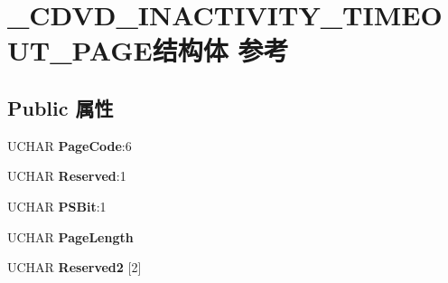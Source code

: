 \hypertarget{struct___c_d_v_d___i_n_a_c_t_i_v_i_t_y___t_i_m_e_o_u_t___p_a_g_e}{}\section{\+\_\+\+C\+D\+V\+D\+\_\+\+I\+N\+A\+C\+T\+I\+V\+I\+T\+Y\+\_\+\+T\+I\+M\+E\+O\+U\+T\+\_\+\+P\+A\+G\+E结构体 参考}
\label{struct___c_d_v_d___i_n_a_c_t_i_v_i_t_y___t_i_m_e_o_u_t___p_a_g_e}
\subsection*{Public 属性}
\begin{DoxyCompactItemize}
\item 
\mbox{\label{struct___c_d_v_d___i_n_a_c_t_i_v_i_t_y___t_i_m_e_o_u_t___p_a_g_e_a80b6680e039ef8156628756c09770e10}} 
U\+C\+H\+AR {\bfseries Page\+Code}\+:6
\item 
\mbox{\label{struct___c_d_v_d___i_n_a_c_t_i_v_i_t_y___t_i_m_e_o_u_t___p_a_g_e_a6608ef48208882048cfb4157eb817781}} 
U\+C\+H\+AR {\bfseries Reserved}\+:1
\item 
\mbox{\label{struct___c_d_v_d___i_n_a_c_t_i_v_i_t_y___t_i_m_e_o_u_t___p_a_g_e_aa391a58bb0388272294df8978f15da64}} 
U\+C\+H\+AR {\bfseries P\+S\+Bit}\+:1
\item 
\mbox{\label{struct___c_d_v_d___i_n_a_c_t_i_v_i_t_y___t_i_m_e_o_u_t___p_a_g_e_a3116422483102164a164c01f44d3cf4e}} 
U\+C\+H\+AR {\bfseries Page\+Length}
\item 
\mbox{\label{struct___c_d_v_d___i_n_a_c_t_i_v_i_t_y___t_i_m_e_o_u_t___p_a_g_e_a8838e6ef641ee74f10a0fdd0d323e23d}} 
U\+C\+H\+AR {\bfseries Reserved2} \mbox{[}2\mbox{]}
\item 
\mbox{\label{struct___c_d_v_d___i_n_a_c_t_i_v_i_t_y___t_i_m_e_o_u_t___p_a_g_e_a348127c088543be4063420f054fc3fda}} 

\end{DoxyCompactItemize}
